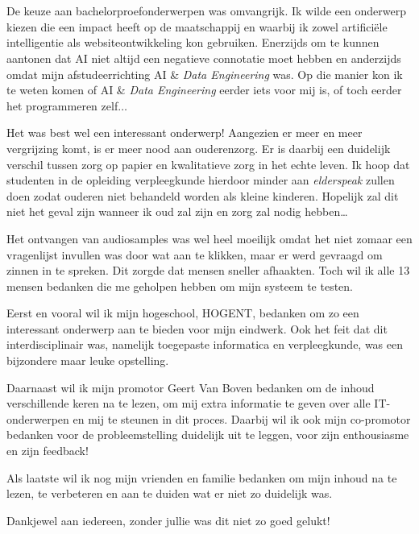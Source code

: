 
\chapter*{}
\label{ch:voorwoord}


De keuze aan bachelorproefonderwerpen was omvangrijk. Ik wilde een onderwerp kiezen die een impact heeft op de maatschappij en waarbij ik zowel artificiële intelligentie als websiteontwikkeling kon gebruiken. Enerzijds om te kunnen aantonen dat AI niet altijd een negatieve connotatie moet hebben en anderzijds omdat mijn afstudeerrichting AI \& \textit{Data Engineering} was. Op die manier kon ik te weten komen of AI \& \textit{Data Engineering} eerder iets voor mij is, of toch eerder het programmeren zelf$\ldots$

Het was best wel een interessant onderwerp! Aangezien er meer en meer vergrijzing komt, is er meer nood aan ouderenzorg. Er is daarbij een duidelijk verschil tussen zorg op papier en kwalitatieve zorg in het echte leven. Ik hoop dat studenten in de opleiding verpleegkunde hierdoor minder aan \textit{elderspeak} zullen doen zodat ouderen niet behandeld worden als kleine kinderen. Hopelijk zal dit niet het geval zijn wanneer ik oud zal zijn en zorg zal nodig hebben\ldots


Het ontvangen van audiosamples was wel heel moeilijk omdat het niet zomaar een vragenlijst invullen was door wat aan te klikken, maar er werd gevraagd om zinnen in te spreken. Dit zorgde dat mensen sneller afhaakten. Toch wil ik alle 13 %
mensen bedanken die me geholpen hebben om mijn systeem te testen.

Eerst en vooral wil ik mijn hogeschool, HOGENT, bedanken om zo een interessant onderwerp aan te bieden voor mijn eindwerk. Ook het feit dat dit interdisciplinair was, namelijk toegepaste informatica en verpleegkunde, was een bijzondere maar leuke opstelling.

Daarnaast wil ik mijn promotor Geert Van Boven bedanken om de inhoud verschillende keren na te lezen, om mij extra informatie te geven over alle IT-onderwerpen en mij te steunen in dit proces.
Daarbij wil ik ook mijn co-promotor bedanken voor de probleemstelling duidelijk uit te leggen, voor zijn enthousiasme en zijn feedback!

Als laatste wil ik nog mijn vrienden en familie bedanken om mijn inhoud na te lezen, te verbeteren en aan te duiden wat er niet zo duidelijk was.

Dankjewel aan iedereen, zonder jullie was dit niet zo goed gelukt!